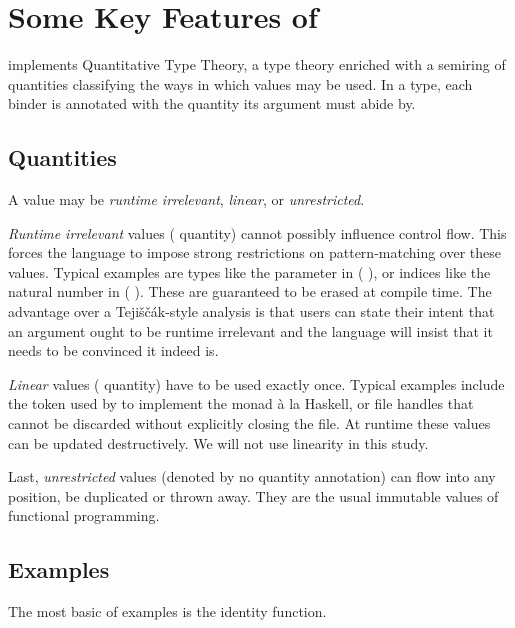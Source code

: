 
\section{Some Key Features of \idris}\label{sec:quantitativeTT}

\idris{} implements Quantitative Type Theory,
a type theory enriched with a semiring of quantities
classifying the ways in which values may be used.
%
In a type, each binder is annotated with the quantity its argument must abide by.

\subsection{Quantities}

A value may be \emph{runtime irrelevant}, \emph{linear}, or \emph{unrestricted}.

\emph{Runtime irrelevant} values ( quantity) cannot possibly influence
control flow.
%
This forces the language to impose strong restrictions on pattern-matching over these
values.
%
Typical examples are types like the  parameter in ( ),
or indices like the natural number  in
(  ).
%
These are guaranteed to be erased at compile time. The advantage over a Tejiščák-style
analysis is that users can state their intent that an argument ought to be runtime
irrelevant and the language will insist that it needs to be convinced it indeed is.

\emph{Linear} values ( quantity) have to be used exactly once.
%
Typical examples include the  token used by \idris{} to implement the
 monad à la Haskell, or file handles that cannot be discarded without explicitly
closing the file.
%
At runtime these values can be updated destructively. We will not use linearity in this study.

Last, \emph{unrestricted} values (denoted by no quantity annotation) can flow into any
position, be duplicated or thrown away.
%
They are the usual immutable values of functional programming.

\subsection{Examples}

The most basic of examples is the identity function.


